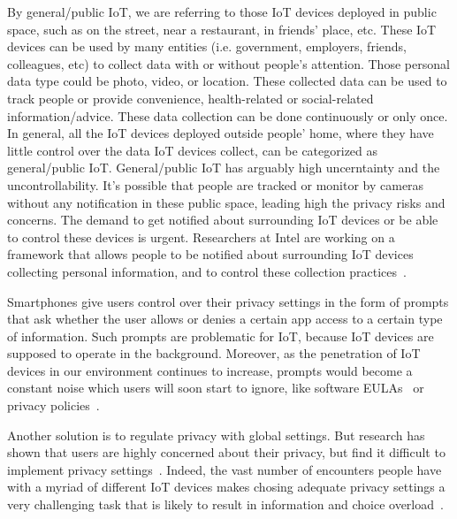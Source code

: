 By general/public IoT, we are referring to those IoT devices deployed in public space, such as on the street, near a restaurant, in friends' place, etc. These IoT devices can be used by many entities (i.e. government, employers, friends, colleagues, etc) to collect data with or without people's attention. Those personal data type could be photo, video, or location. These collected data can be used to track people or provide convenience, health-related or social-related information/advice. These data collection can be done continuously or only once. In general, all the IoT devices deployed outside people' home, where they have little control over the data IoT devices collect, can be categorized as general/public IoT. General/public IoT has arguably high uncerntainty and the uncontrollability. It's possible that people are tracked or monitor by cameras without any notification in these public space, leading high the privacy risks and concerns. The demand to get notified about surrounding IoT devices or be able to control these devices is urgent. Researchers at Intel are working on a framework that allows people to be notified about surrounding IoT devices collecting personal information, and to control these collection practices~\cite{chow2015hci}.

Smartphones give users control over their privacy settings in the form of prompts that ask whether the user allows or denies a certain app access to a certain type of information. Such prompts are problematic for IoT, because IoT devices are supposed to operate in the background. Moreover, as the penetration of IoT devices in our environment continues to increase, prompts would become a constant noise which users will soon start to ignore, like software EULAs~\cite{good2005spyware} or privacy policies~\cite{jensen2004privacy}. 

Another solution is to regulate privacy with global settings. But research has shown that users are highly concerned about their privacy, but find it difficult to implement privacy settings~\cite{acquisti2006imagined, gross2005inf, madejski2012study}. Indeed, the vast number of encounters people have with a myriad of different IoT devices makes chosing adequate privacy settings a very challenging task that is likely to result in information and choice overload~\cite{williams2016perfect}.

